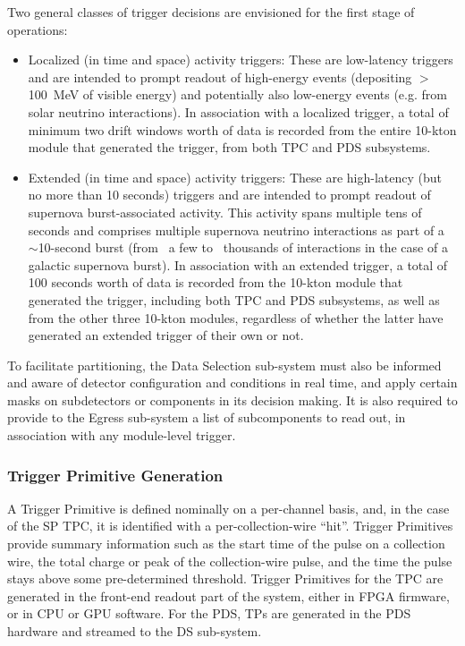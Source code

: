 Two general classes of trigger decisions are envisioned for the first
stage of operations:
\begin{itemize}
 \item Localized (in time and space) activity triggers: These are
   low-latency triggers and are intended to prompt readout of
   high-energy events (depositing $>$100~MeV of visible energy) 
   and potentially also low-energy events
   (e.g. from solar neutrino interactions). In association with a
   localized trigger, a total of minimum two drift windows worth of data is recorded from
   the entire 10-kton module that generated the trigger, from
   both TPC and PDS subsystems.   
\item Extended (in time and space) activity triggers: These are
  high-latency (but no more than 10 seconds) triggers and are intended to prompt readout of
  supernova burst-associated activity. This activity spans multiple
  tens of seconds and comprises multiple supernova neutrino
  interactions as part of a $\sim$10-second burst (from ~a few to
  ~thousands of interactions in the case of a galactic supernova
  burst). In association with an extended trigger, a total of \num{100}
  seconds worth of data is recorded from the 10-kton module that
  generated the trigger, including both TPC and PDS subsystems, as
  well as from the other three 10-kton modules, regardless of whether
  the latter have generated an extended trigger of their own or not.  
\end{itemize}

To facilitate partitioning, the Data Selection sub-system must also be
informed and aware of detector configuration and conditions in real
time, and apply certain masks on subdetectors or components
in its decision making. It is also required to provide to the Egress sub-system a list of
subcomponents to read out, in association
with any module-level trigger.

\subsubsection{Trigger Primitive Generation}
\label{sec:sp-daq:design-trigger-primitives}

A Trigger Primitive is defined nominally on a per-channel basis, and,
in the case of the SP TPC, it is identified with a per-collection-wire
``hit''. Trigger Primitives provide summary information
such as the start time of the pulse on a collection wire, the total
charge or peak of the collection-wire pulse, and the time the pulse
stays above some pre-determined threshold. Trigger Primitives for the
TPC are generated in the front-end readout part of the  
system, either in FPGA firmware, or in CPU or GPU software. For the
PDS, TPs are generated in the PDS hardware and streamed to the 
DS sub-system.

